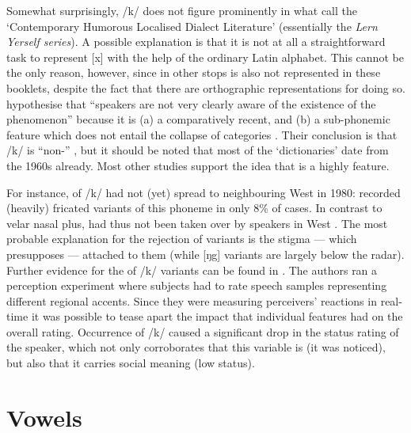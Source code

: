 Somewhat surprisingly, /k/  does not figure prominently in what \citeauthor{honeybonewatson2013} call the `Contemporary Humorous Localised Dialect Literature' (essentially the \emph{Lern Yerself  series}).
A possible explanation is that it is not at all a straightforward task to represent [x] with the help of the ordinary Latin alphabet.
This cannot be the only reason, however, since  in other stops is also not represented in these booklets, despite the fact that there are orthographic representations for doing so.
\citeauthor{honeybonewatson2013} hypothesise that ``speakers are not very clearly aware of the existence of the phenomenon'' because it is (a) a comparatively recent, and (b) a sub-phonemic feature which does not entail the collapse of categories \parencite[cf.][329--331]{honeybonewatson2013}.
Their conclusion is that /k/  is ``non-'' \parencite[333]{honeybonewatson2013}, but it should be noted that most of the  `dictionaries' date from the 1960s already.
Most other studies support the idea that  is a highly  feature.

For instance,  of /k/ had not (yet) spread to neighbouring West  in 1980: \textcite[cf.][97]{newbrook1999} recorded (heavily) fricated variants of this phoneme in only 8\% of cases.
In contrast to velar nasal plus,   had thus not been taken over by speakers in West .
The most probable explanation for the rejection of  variants is the stigma --- which presupposes  --- attached to them (while [ŋg] variants are largely below the radar).
Further evidence for the  of  /k/ variants can be found in \citealt{watsonclark2015}.
The authors ran a perception experiment where subjects had to rate speech samples representing different regional accents.
Since they were measuring perceivers' reactions in real-time it was possible to tease apart the impact that individual features had on the overall rating.
Occurrence of /k/  caused a significant drop in the status rating of the speaker, which not only corroborates that this variable is  (it was noticed), but also that it carries social meaning (low status).

	\section{Vowels}\label{sec.var.vow}

